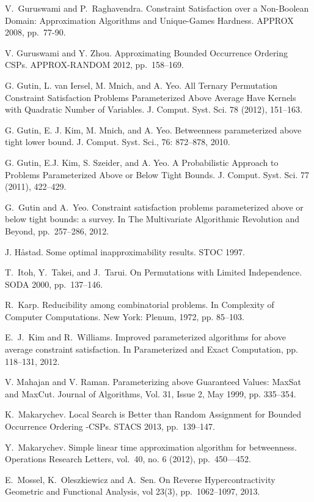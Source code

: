 \documentclass[11pt]{article}
\begin{document}
\begin{thebibliography}{WW}
V.~Guruswami and P.~Raghavendra. Constraint Satisfaction over a Non-Boolean Domain:
Approximation Algorithms and Unique-Games Hardness. APPROX 2008, pp.~77-90.

V. Guruswami and Y. Zhou.
Approximating Bounded Occurrence Ordering CSPs. APPROX-RANDOM 2012, pp.~158--169.

G. Gutin, L. van Iersel, M. Mnich, and A. Yeo. All Ternary Permutation Constraint Satisfaction Problems Parameterized Above Average Have Kernels with Quadratic Number of Variables. J. Comput. Syst. Sci. 78 (2012), 151--163.

G. Gutin, E. J. Kim, M. Mnich, and A. Yeo. Betweenness parameterized above tight lower bound. J. Comput. Syst. Sci., 76: 872--878, 2010.

G. Gutin, E.J. Kim, S. Szeider, and A. Yeo. A Probabilistic Approach to Problems Parameterized
Above or Below Tight Bounds. J. Comput. Syst. Sci. 77 (2011), 422--429.


 G.~Gutin and A.~Yeo. Constraint satisfaction problems parameterized above or below tight bounds: a survey. In The Multivariate Algorithmic Revolution and Beyond,
pp.~257--286, 2012.

J. H{\aa}stad. Some optimal inapproximability results. STOC 1997.


T.~Itoh, Y.~Takei, and J.~Tarui.
On Permutations with Limited Independence.
SODA 2000, pp.~137--146.

R.~Karp.
Reducibility among combinatorial problems. In Complexity of Computer Computations.
New York: Plenum, 1972, pp. 85--103.

 E.~J.~Kim and R.~Williams. Improved parameterized algorithms for above average constraint satisfaction. In Parameterized and Exact Computation, pp. 118--131, 2012.

 V. Mahajan and V. Raman. Parameterizing above Guaranteed Values: MaxSat and MaxCut. Journal of Algorithms, Vol. 31, Issue 2, May 1999, pp. 335--354.

 K.~Makarychev. Local Search is Better than Random Assignment for Bounded Occurrence Ordering -CSPs. STACS 2013, pp.~139--147.

 Y.~Makarychev. Simple linear time approximation algorithm for betweenness. Operations Research Letters, vol.~40, no. 6 (2012), pp.~450---452.

E.~Mossel, K.~Oleszkiewicz and A.~Sen.
On Reverse Hypercontractivity
Geometric and Functional Analysis, vol 23(3), pp.~1062--1097, 2013.


\end{thebibliography}
\end{document}
